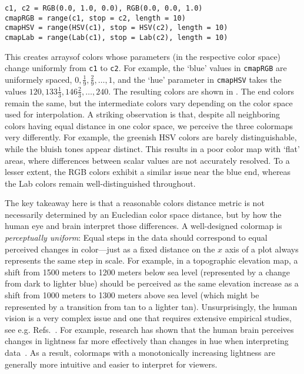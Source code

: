 \begin{listing}[h]
\begin{verbatim} 
c1, c2 = RGB(0.0, 1.0, 0.0), RGB(0.0, 0.0, 1.0)
cmapRGB = range(c1, stop = c2, length = 10) 
cmapHSV = range(HSV(c1), stop = HSV(c2), length = 10) 
cmapLab = range(Lab(c1), stop = Lab(c2), length = 10) 
\end{verbatim}
\end{listing}

This creates arraysof colors whose parameters (in the respective color space) change uniformly from \verb|c1| to \verb|c2|. For example, the `blue' values in \verb|cmapRGB| are uniformely spaced, $0,\frac{1}{9},\frac{2}{9},\ldots,1$, and the `hue' parameter in \verb|cmapHSV| takes the values $120,133\frac{1}{3},146\frac{2}{3},\ldots,240$.
The resulting colors are shown in . 
The end colors remain the same, but the intermediate colors vary depending on the color space used for interpolation. A striking observation is that, despite all neighboring colors having equal distance in one color space, we perceive the three colormaps very differently. For example, the greenish HSV colors are barely distinguishable, while the bluish tones appear distinct. This results in a poor color map with `flat' areas, where differences between scalar values are not accurately resolved. To a lesser extent, the RGB colors exhibit a similar issue near the blue end, whereas the Lab colors remain well-distinguished throughout.

The key takeaway here is that a reasonable colors distance metric is not necessarily determined by an Eucledian color space distance, but by how the human eye and brain interpret those differences. A well-designed colormap is \emph{perceptually uniform}: Equal steps in the data should correspond to equal perceived changes in color---just as a fixed distance on the $x$ axis of a plot always represents the same step in scale. For example, in a topographic elevation map, a shift from 1500 meters to 1200 meters below sea level (represented by a change from dark to lighter blue) should be perceived as the same elevation increase as a shift from 1000 meters to 1300 meters above sea level (which might be represented by a transition from tan to a lighter tan).
Unsurprisingly, the human vision is a very complex issue and one that requires extensive empirical studies, see e.g. Refs.~\cite{rogowitz1996,mullen1985,crameri2020}. For example, research has shown that the human brain perceives changes in lightness far more effectively than changes in hue when interpreting data~\cite{rogowitz1996}. As a result, colormaps with a monotonically increasing lightness are generally more intuitive and easier to interpret for viewers.

